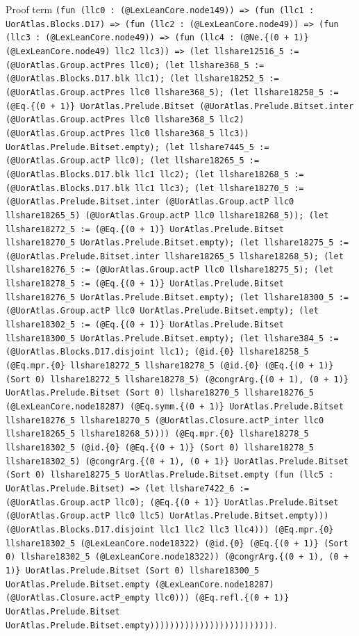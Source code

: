 \documentclass[11pt]{article}
\begin{document}
\noindent Proof term \texttt{(fun (llc0 : (@LexLeanCore.node149)) => (fun (llc1 : UorAtlas.Blocks.D17) => (fun (llc2 : (@LexLeanCore.node49)) => (fun (llc3 : (@LexLeanCore.node49)) => (fun (llc4 : (@Ne.\{(0 + 1)\} (@LexLeanCore.node49) llc2 llc3)) => (let llshare12516\_5 := (@UorAtlas.Group.actPres llc0); (let llshare368\_5 := (@UorAtlas.Blocks.D17.blk llc1); (let llshare18252\_5 := (@UorAtlas.Group.actPres llc0 llshare368\_5); (let llshare18258\_5 := (@Eq.\{(0 + 1)\} UorAtlas.Prelude.Bitset (@UorAtlas.Prelude.Bitset.inter (@UorAtlas.Group.actPres llc0 llshare368\_5 llc2) (@UorAtlas.Group.actPres llc0 llshare368\_5 llc3)) UorAtlas.Prelude.Bitset.empty); (let llshare7445\_5 := (@UorAtlas.Group.actP llc0); (let llshare18265\_5 := (@UorAtlas.Blocks.D17.blk llc1 llc2); (let llshare18268\_5 := (@UorAtlas.Blocks.D17.blk llc1 llc3); (let llshare18270\_5 := (@UorAtlas.Prelude.Bitset.inter (@UorAtlas.Group.actP llc0 llshare18265\_5) (@UorAtlas.Group.actP llc0 llshare18268\_5)); (let llshare18272\_5 := (@Eq.\{(0 + 1)\} UorAtlas.Prelude.Bitset llshare18270\_5 UorAtlas.Prelude.Bitset.empty); (let llshare18275\_5 := (@UorAtlas.Prelude.Bitset.inter llshare18265\_5 llshare18268\_5); (let llshare18276\_5 := (@UorAtlas.Group.actP llc0 llshare18275\_5); (let llshare18278\_5 := (@Eq.\{(0 + 1)\} UorAtlas.Prelude.Bitset llshare18276\_5 UorAtlas.Prelude.Bitset.empty); (let llshare18300\_5 := (@UorAtlas.Group.actP llc0 UorAtlas.Prelude.Bitset.empty); (let llshare18302\_5 := (@Eq.\{(0 + 1)\} UorAtlas.Prelude.Bitset llshare18300\_5 UorAtlas.Prelude.Bitset.empty); (let llshare384\_5 := (@UorAtlas.Blocks.D17.disjoint llc1); (@id.\{0\} llshare18258\_5 (@Eq.mpr.\{0\} llshare18272\_5 llshare18278\_5 (@id.\{0\} (@Eq.\{(0 + 1)\} (Sort 0) llshare18272\_5 llshare18278\_5) (@congrArg.\{(0 + 1), (0 + 1)\} UorAtlas.Prelude.Bitset (Sort 0) llshare18270\_5 llshare18276\_5 (@LexLeanCore.node18287) (@Eq.symm.\{(0 + 1)\} UorAtlas.Prelude.Bitset llshare18276\_5 llshare18270\_5 (@UorAtlas.Closure.actP\_inter llc0 llshare18265\_5 llshare18268\_5)))) (@Eq.mpr.\{0\} llshare18278\_5 llshare18302\_5 (@id.\{0\} (@Eq.\{(0 + 1)\} (Sort 0) llshare18278\_5 llshare18302\_5) (@congrArg.\{(0 + 1), (0 + 1)\} UorAtlas.Prelude.Bitset (Sort 0) llshare18275\_5 UorAtlas.Prelude.Bitset.empty (fun (llc5 : UorAtlas.Prelude.Bitset) => (let llshare7422\_6 := (@UorAtlas.Group.actP llc0); (@Eq.\{(0 + 1)\} UorAtlas.Prelude.Bitset (@UorAtlas.Group.actP llc0 llc5) UorAtlas.Prelude.Bitset.empty))) (@UorAtlas.Blocks.D17.disjoint llc1 llc2 llc3 llc4))) (@Eq.mpr.\{0\} llshare18302\_5 (@LexLeanCore.node18322) (@id.\{0\} (@Eq.\{(0 + 1)\} (Sort 0) llshare18302\_5 (@LexLeanCore.node18322)) (@congrArg.\{(0 + 1), (0 + 1)\} UorAtlas.Prelude.Bitset (Sort 0) llshare18300\_5 UorAtlas.Prelude.Bitset.empty (@LexLeanCore.node18287) (@UorAtlas.Closure.actP\_empty llc0))) (@Eq.refl.\{(0 + 1)\} UorAtlas.Prelude.Bitset UorAtlas.Prelude.Bitset.empty)))))))))))))))))))))))))}.\par
\end{document}
